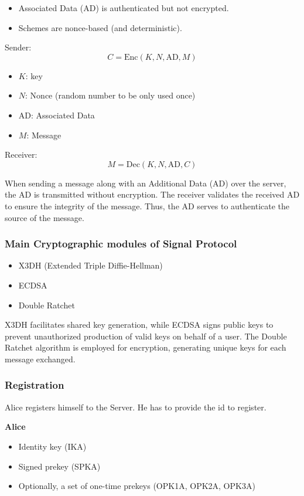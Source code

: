 \documentclass[11pt]{article}
\begin{document}
\begin{itemize}
    \item Associated Data (AD) is authenticated but not encrypted.
    \item Schemes are nonce-based (and deterministic).
\end{itemize}

Sender: 
\[ C = \text{Enc}(K, N, \text{AD}, M) \]
\begin{itemize}
    \item $K$: key
    \item $N$: Nonce (random number to be only used once)
    \item $\text{AD}$: Associated Data
    \item $M$: Message
\end{itemize}

Receiver: 
\[ M = \text{Dec}(K, N, \text{AD}, C) \]

When sending a message along with an Additional Data (AD) over the server, the AD is transmitted without encryption. The receiver validates the received AD to ensure the integrity of the message. Thus, the AD serves to authenticate the source of the message.

\subsubsection{Main Cryptographic modules of Signal Protocol}

\begin{itemize}
    \item X3DH (Extended Triple Diffie-Hellman)
    \item ECDSA
    \item Double Ratchet
\end{itemize}

X3DH facilitates shared key generation, while ECDSA signs public keys to prevent unauthorized production of valid keys on behalf of a user. The Double Ratchet algorithm is employed for encryption, generating unique keys for each message exchanged.

\subsubsection{Registration}

Alice registers himself to the Server. He has to provide the id to register.

\textbf{Alice}
\begin{itemize}
    \item Identity key (IKA)
    \item Signed prekey (SPKA)
    \item Optionally, a set of one-time prekeys (OPK1A, OPK2A, OPK3A)
\end{itemize}
\end{document}
